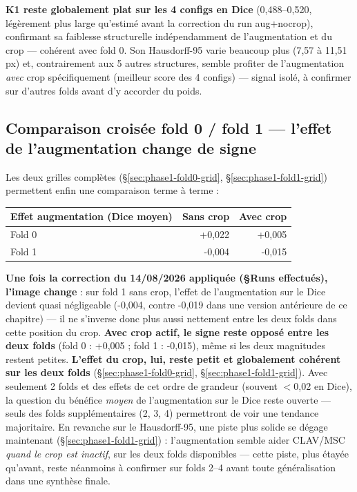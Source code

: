 \textbf{K1 reste globalement plat sur les 4 configs en Dice} (0,488--0,520,
légèrement plus large qu'estimé avant la correction du run aug+nocrop), confirmant
sa faiblesse structurelle indépendamment de l'augmentation et du crop --- cohérent
avec fold 0. Son Hausdorff-95 varie beaucoup plus (7,57 à 11,51\,px) et,
contrairement aux 5 autres structures, semble profiter de l'augmentation \emph{avec}
crop spécifiquement (meilleur score des 4 configs) --- signal isolé, à confirmer sur
d'autres folds avant d'y accorder du poids.

\subsection{Comparaison croisée fold 0 / fold 1 --- l'effet de l'augmentation change
de signe}
\label{sec:phase1-aug-signe}

Les deux grilles complètes (\S\ref{sec:phase1-fold0-grid},
\S\ref{sec:phase1-fold1-grid}) permettent enfin une comparaison terme à terme :

\begin{center}
\begin{tabular}{lrr}
\toprule
Effet augmentation (Dice moyen) & Sans crop & Avec crop \\
\midrule
Fold 0 & +0,022 & +0,005 \\
Fold 1 & -0,004 & -0,015 \\
\bottomrule
\end{tabular}
\end{center}

\textbf{Une fois la correction du 14/08/2026 appliquée (\S Runs effectués), l'image
change} : sur fold 1 sans crop, l'effet de l'augmentation sur le Dice devient
quasi négligeable (-0,004, contre -0,019 dans une version antérieure de ce chapitre)
--- il ne s'inverse donc plus aussi nettement entre les deux folds dans cette
position du crop. \textbf{Avec crop actif, le signe reste opposé entre les deux
folds} (fold 0 : +0,005 ; fold 1 : -0,015), même si les deux magnitudes restent
petites. \textbf{L'effet du crop, lui, reste petit et globalement cohérent sur les
deux folds} (\S\ref{sec:phase1-fold0-grid}, \S\ref{sec:phase1-fold1-grid}). Avec
seulement 2 folds et des effets de cet ordre de grandeur (souvent $<$0,02 en Dice),
la question du bénéfice \emph{moyen} de l'augmentation sur le Dice reste ouverte ---
seuls des folds supplémentaires (2, 3, 4) permettront de voir une tendance
majoritaire. En revanche sur le Hausdorff-95, une piste plus solide se dégage
maintenant (\S\ref{sec:phase1-fold1-grid}) : l'augmentation semble aider CLAV/MSC
\emph{quand le crop est inactif}, sur les deux folds disponibles --- cette piste,
plus étayée qu'avant, reste néanmoins à confirmer sur folds 2--4 avant toute
généralisation dans une synthèse finale.

